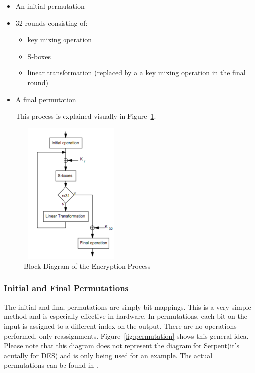 \documentclass[12pt]{article} %
\begin{document}
\begin{itemize}
\item An initial permutation
\item 32 rounds consisting of:
\begin{itemize}
\item key mixing operation
\item S-boxes
\item linear transformation (replaced by a a key mixing operation in the final round)
\end{itemize}
\item A final permutation

This process is explained visually in Figure~\ref{fig:Block Diagram of Encryption}.


\end{itemize}
\begin{figure}[H]
\centering
\includegraphics[width=5cm,height=7cm]{encryption}
\caption{Block Diagram of the Encryption Process}
\label{fig:Block Diagram of Encryption}
\end{figure}

\subsubsection{Initial and Final Permutations}
The initial and final permutations are simply bit mappings. This is a very simple method and is especially effective in hardware. In permutations, each bit on the input is assigned to a different index on the output. There are no operations performed, only reassignments. Figure~\ref{fig:permutation} shows this general idea. Please note that this diagram does not represent the diagram for Serpent(it's acutally for DES) and is only being used for an example. The actual permutations can be found in \cite{SERPENT}.
\end{document}
